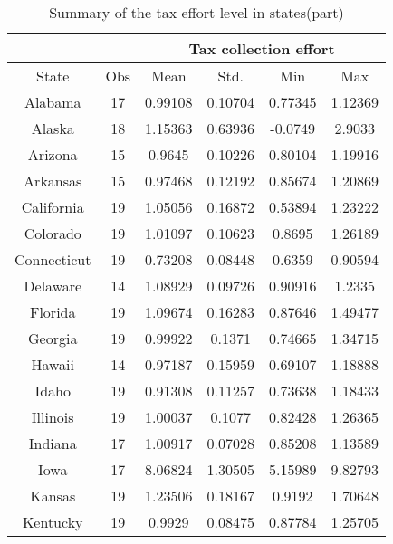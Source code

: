 \begin{table}[htbp]
    \centering
    \caption{Summary of the tax effort level in states(part)}
    \begin{tabular}{cccccc}
        \toprule
                    &     & \multicolumn{4}{c}{Tax collection effort}                               \\
        \midrule
        State       & Obs & Mean                                      & Std.    & Min     & Max     \\
        \midrule
        Alabama     & 17  & 0.99108                                   & 0.10704 & 0.77345 & 1.12369 \\
        Alaska      & 18  & 1.15363                                   & 0.63936 & -0.0749 & 2.9033  \\
        Arizona     & 15  & 0.9645                                    & 0.10226 & 0.80104 & 1.19916 \\
        Arkansas    & 15  & 0.97468                                   & 0.12192 & 0.85674 & 1.20869 \\
        California  & 19  & 1.05056                                   & 0.16872 & 0.53894 & 1.23222 \\
        Colorado    & 19  & 1.01097                                   & 0.10623 & 0.8695  & 1.26189 \\
        Connecticut & 19  & 0.73208                                   & 0.08448 & 0.6359  & 0.90594 \\
        Delaware    & 14  & 1.08929                                   & 0.09726 & 0.90916 & 1.2335  \\
        Florida     & 19  & 1.09674                                   & 0.16283 & 0.87646 & 1.49477 \\
        Georgia     & 19  & 0.99922                                   & 0.1371  & 0.74665 & 1.34715 \\
        Hawaii      & 14  & 0.97187                                   & 0.15959 & 0.69107 & 1.18888 \\
        Idaho       & 19  & 0.91308                                   & 0.11257 & 0.73638 & 1.18433 \\
        Illinois    & 19  & 1.00037                                   & 0.1077  & 0.82428 & 1.26365 \\
        Indiana     & 17  & 1.00917                                   & 0.07028 & 0.85208 & 1.13589 \\
        Iowa        & 17  & 8.06824                                   & 1.30505 & 5.15989 & 9.82793 \\
        Kansas      & 19  & 1.23506                                   & 0.18167 & 0.9192  & 1.70648 \\
        Kentucky    & 19  & 0.9929                                    & 0.08475 & 0.87784 & 1.25705 \\
        \bottomrule
    \end{tabular}%
    \label{taxeffortsum}%
\end{table}%

